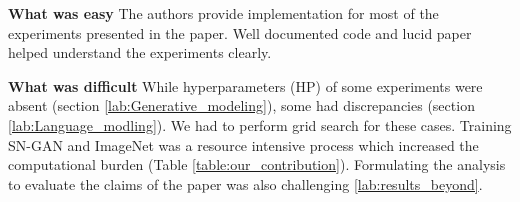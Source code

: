 
\textbf{What was easy} The authors provide implementation for most of the experiments presented in the paper. Well documented code and lucid paper helped understand the experiments clearly.


\textbf{What was difficult} While hyperparameters (HP) of some experiments were absent (section \ref{lab:Generative_modeling}), some had discrepancies (section \ref{lab:Language_modling}). We had to perform grid search for these cases. Training SN-GAN and ImageNet was a resource intensive process which increased the computational burden (Table \ref{table:our_contribution}). Formulating the analysis to evaluate the claims of the paper was also challenging \ref{lab:results_beyond}.




